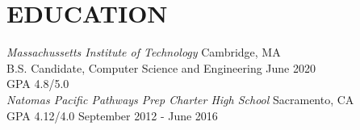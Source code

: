 \documentclass[8pt]{res}
\begin{document}
\opening

\vspace{-1em}

\section{EDUCATION} 
  {\sl Massachussetts Institute of Technology}               \hfill Cambridge, MA\\
    B.S. Candidate, Computer Science and Engineering         \hfill June 2020\\
    GPA 4.8/5.0 \\

  {\sl Natomas Pacific Pathways Prep Charter High School}    \hfill Sacramento, CA \\
    GPA 4.12/4.0                                             \hfill September 2012 - June 2016

\vspace{-1em}
\end{document}
